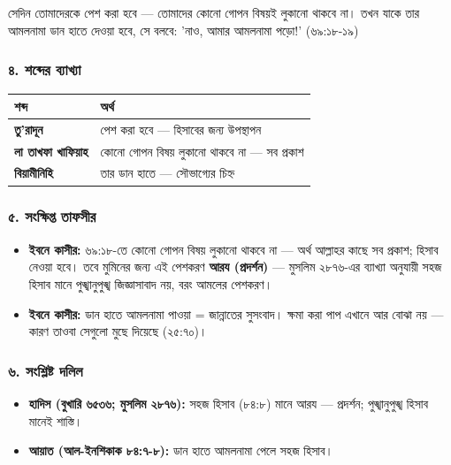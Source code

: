 সেদিন তোমাদেরকে পেশ করা হবে — তোমাদের কোনো গোপন বিষয়ই লুকানো থাকবে না। তখন যাকে তার আমলনামা ডান হাতে দেওয়া হবে, সে বলবে: 'নাও, আমার আমলনামা পড়ো!' (৬৯:১৮-১৯)

\subsubsection*{৪. শব্দের ব্যাখ্যা}

\begin{table}[h]\centering\small
\begin{tabular}{ll}
শব্দ & অর্থ \\
\hline
\textbf{তু'রাদূন} & পেশ করা হবে — হিসাবের জন্য উপস্থাপন \\
\textbf{লা তাখফা খাফিয়াহ} & কোনো গোপন বিষয় লুকানো থাকবে না — সব প্রকাশ \\
\textbf{বিয়ামীনিহি} & তার ডান হাতে — সৌভাগ্যের চিহ্ন \\
\hline
\end{tabular}
\end{table}

\subsubsection*{৫. সংক্ষিপ্ত তাফসীর}

\begin{itemize}
\item \textbf{ইবনে কাসীর:} ৬৯:১৮-তে কোনো গোপন বিষয় লুকানো থাকবে না — অর্থ আল্লাহর কাছে সব প্রকাশ; হিসাব নেওয়া হবে। তবে মুমিনের জন্য এই পেশকরণ \textbf{আরয (প্রদর্শন)} — মুসলিম ২৮৭৬-এর ব্যাখ্যা অনুযায়ী সহজ হিসাব মানে পুঙ্খানুপুঙ্খ জিজ্ঞাসাবাদ নয়, বরং আমলের পেশকরণ।
\item \textbf{ইবনে কাসীর:} ডান হাতে আমলনামা পাওয়া = জান্নাতের সুসংবাদ। ক্ষমা করা পাপ এখানে আর বোঝা নয় — কারণ তাওবা সেগুলো মুছে দিয়েছে (২৫:৭০)।
\end{itemize}
\subsubsection*{৬. সংশ্লিষ্ট দলিল}

\begin{itemize}
\item \textbf{হাদিস (বুখারি ৬৫৩৬; মুসলিম ২৮৭৬):} সহজ হিসাব (৮৪:৮) মানে আরয — প্রদর্শন; পুঙ্খানুপুঙ্খ হিসাব মানেই শাস্তি।
\item \textbf{আয়াত (আল-ইনশিকাক ৮৪:৭-৮):} ডান হাতে আমলনামা পেলে সহজ হিসাব।
\end{itemize}
